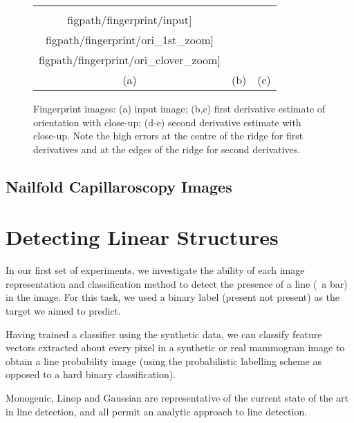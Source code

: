 \begin{figure}[t]
\centering
\begin{tabular}{c c c}
\texttt{[image: \\figpath/fingerprint/input]} &
\texttt{[image: \\figpath/fingerprint/ori\_1st\_zoom]} &
\texttt{[image: \\figpath/fingerprint/ori\_clover\_zoom]} \\
(a) & (b) & (c) \\
\end{tabular}
%
\caption{Fingerprint images: %
(a) input image; %
(b,c) first derivative estimate of orientation with close-up; %
(d-e) second derivative estimate with close-up. Note the high errors at the centre of the ridge for first derivatives and at the edges of the ridge for second derivatives.}
\label{f:fingerprints}
\end{figure}


\subsection{Nailfold Capillaroscopy Images}



\section{Detecting Linear Structures}
In our first set of experiments, we investigate the ability of each image representation and classification method to detect the presence of a line (\ie~a bar) in the image. For this task, we used a binary label (present \vs not present) as the target we aimed to predict.

Having trained a classifier using the synthetic data, we can classify feature vectors extracted about every pixel in a synthetic or real mammogram image to obtain a line probability image (using the probabilistic labelling scheme as opposed to a hard binary classification).

Monogenic, Linop and Gaussian are representative of the current state of the art in line detection, and all permit an analytic approach to line detection.

